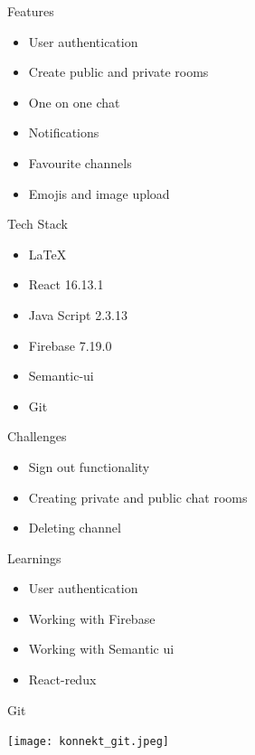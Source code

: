 \documentclass[14pt]{beamer}
\begin{document}
\begin{frame}{Features}
	\begin{itemize}
	    \item User authentication
		\item Create public and private rooms
		\item One on one chat
		\item Notifications
		\item Favourite channels
		\item Emojis and image upload
	\end{itemize}
\end{frame}

\begin{frame}{Tech Stack}
\begin{itemize}
	\item LaTeX
	\item React 16.13.1
	\item Java Script 2.3.13
	\item Firebase 7.19.0
	\item Semantic-ui
	\item Git
\end{itemize}
\end{frame}

\begin{frame}{Challenges}
	\begin{itemize}
		\item Sign out functionality
		\item Creating private and public chat rooms
		\item Deleting channel
	\end{itemize}
\end{frame}

\begin{frame}{Learnings}
	\begin{itemize}
		\item User authentication 
		\item Working with Firebase
		\item Working with Semantic ui
		\item React-redux
	\end{itemize}
\end{frame}

\begin{frame}{Git}
	\begin{center}
	\texttt{[image: konnekt\_git.jpeg]}
	\end{center}
\end{frame}
\end{document}
